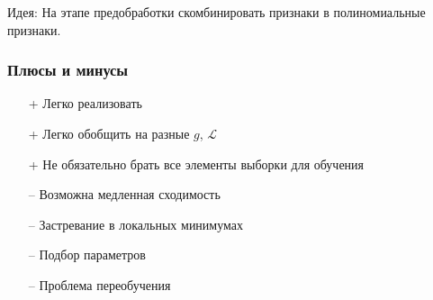\documentclass[10pt]{beamer}
\begin{document}
\begin{frame}
  \alert{Идея}: На этапе предобработки скомбинировать признаки в полиномиальные признаки.
\end{frame}

\begin{frame}\frametitle{Плюсы и минусы}
	\begin{itemize} [<+->]
	\item[+] Легко реализовать
	\item[+] Легко обобщить на разные $g$, $\mathcal{L}$
	\item[+] Не обязательно брать все элементы выборки для обучения
	\bigbreak
	\item[--] Возможна медленная сходимость
	\item[--] Застревание в локальных минимумах
	\item[--] Подбор параметров
	\item[--] Проблема переобучения
	\end{itemize}
\end{frame}



\end{document}
